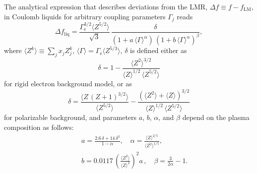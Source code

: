 \documentclass[traditabstract]{aa}
\newcommand{\beq}{\begin{equation}}
\newcommand{\eeq}{\end{equation}}
\newcommand{\bea}{\begin{eqnarray}}
\newcommand{\eea}{\end{eqnarray}}
\newcommand{\Gamme}{\Gamma_\mathrm{e}}
\begin{document}
The analytical expression that describes deviations from the
LMR, $\Delta f\equiv f-f_\mathrm{LM}$,
in Coulomb liquids for arbitrary coupling parameters
$\Gamma_j$ reads
\citep{PCCDR09}
\beq
   \Delta f_\mathrm{liq}
 = \frac{\Gamme^{3/2} \langle Z^{5/2}\rangle}{\sqrt{3}}
 \,\frac{\delta}{
 (1 + a\, \langle\Gamma\rangle^\alpha)
   \,(1+ b\,\langle\Gamma\rangle^\alpha)^\beta},
\eeq
where $\langle Z^k \rangle \equiv \sum_j x_j Z_j^k$,
$\langle\Gamma\rangle=\Gamme\langle Z^{5/3} \rangle$, 
$\delta$ is defined either as
\beq
   \delta = 1 -
    \frac{\langle Z^2\rangle^{3/2}}{\langle Z\rangle^{1/2}
          \,\langle Z^{5/2}\rangle}
\eeq
for rigid electron background model, or as
\beq
   \delta =  \frac{\langle Z\,(Z+1)^{3/2}\rangle}{\langle Z^{5/2}\rangle}
   - \frac{(\langle Z^2\rangle+\langle Z\rangle)^{3/2}
   }{\langle Z\rangle^{1/2}\,\langle Z^{5/2}\rangle}
\label{delta2}
\eeq
for polarizable background, and parameters $a$, $b$, $\alpha$, and
$\beta$ depend on the plasma composition as follows:
\bea&&
   a = \frac{2.6\,\delta+14\,\delta^3}{1-\alpha},
\quad
   \alpha = \frac{ \langle Z \rangle^{2/5}}{\langle Z^2 \rangle^{1/5} },
\label{alpha}\\&&
   b = 0.0117\,\left(\frac{\langle Z^2 \rangle }{
    \langle Z \rangle^2}\right)^{\!\!2} a\,,
\quad
   \beta = \frac{3}{2\alpha}-1.
\label{beta}
\eea
\end{document}
